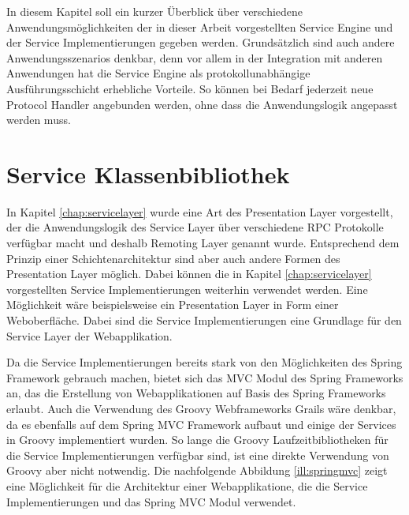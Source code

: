 \label{chap:concept}
In diesem Kapitel soll ein kurzer Überblick über verschiedene
Anwendungsmöglichkeiten der in dieser Arbeit vorgestellten Service Engine und der
Service Implementierungen gegeben werden. Grundsätzlich sind auch andere
Anwendungsszenarios denkbar, denn vor allem in der Integration mit anderen
Anwendungen hat die Service Engine als protokollunabhängige Ausführungsschicht
erhebliche Vorteile. So können bei Bedarf jederzeit neue Protocol Handler
angebunden werden, ohne dass die Anwendungslogik angepasst werden muss.

\section{Service Klassenbibliothek}
In Kapitel \ref{chap:servicelayer} wurde eine Art des Presentation Layer
vorgestellt, der die Anwendungslogik des Service Layer über verschiedene \ac{RPC}
Protokolle verfügbar macht und deshalb Remoting Layer genannt wurde.
Entsprechend dem Prinzip einer Schichtenarchitektur sind aber auch andere Formen
des Presentation Layer möglich. Dabei können die in Kapitel
\ref{chap:servicelayer} vorgestellten Service Implementierungen
weiterhin verwendet werden. Eine Möglichkeit wäre beispielsweise ein
Presentation Layer in Form einer Weboberfläche. Dabei sind die Service
Implementierungen eine Grundlage für den Service Layer der Webapplikation.

Da die Service Implementierungen bereits stark von den Möglichkeiten des Spring
Framework gebrauch machen, bietet sich das \ac{MVC} Modul des Spring Frameworks
an, das die Erstellung von Webapplikationen auf Basis des Spring Frameworks
erlaubt. Auch die Verwendung des Groovy Webframeworks Grails wäre denkbar, da es
ebenfalls auf dem Spring \ac{MVC} Framework aufbaut und einige der Services in
Groovy implementiert wurden. So lange die Groovy Laufzeitbibliotheken für die
Service Implementierungen verfügbar sind, ist eine direkte Verwendung von Groovy
aber nicht notwendig. Die nachfolgende Abbildung \ref{ill:springmvc} zeigt eine
Möglichkeit für die Architektur einer Webapplikatione, die die Service
Implementierungen und das Spring \ac{MVC} Modul verwendet.

